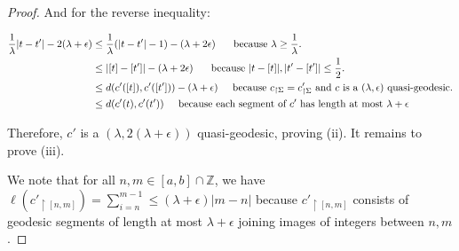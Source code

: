 \documentclass[12pt]{article}
\newcommand{\vs}{\vskip10pt}
\begin{document}
\begin{proof}
 		And for the reverse inequality: 
 		
		\vs 
		
		\begin{align*}
		\frac{1}{\lambda} \vert t - t' \vert - 2(\lambda + \epsilon) &\leq \frac{1}{\lambda} (\vert t - t' \vert - 1) - (\lambda + 2 \epsilon) \hspace{0.5cm} \text{ because } \lambda \geq \frac{1}{\lambda}. \\
		&\leq \vert [t] - [t'] \vert - (\lambda + 2 \epsilon) \hspace{0.5cm} \text{ because } \vert t - [t] \vert, \vert t' - [t'] \vert \leq \frac{1}{2}. \\
		&\leq d(c'([t]), c'([t'])) - (\lambda + \epsilon) \hspace{0.5cm} \text{because } c_{\restriction \Sigma} = c'_{\restriction \Sigma} \text{ and } c \text{ is a } (\lambda, \epsilon) \text{ quasi-geodesic}. \\
		&\leq d(c'(t), c'(t')) \hspace{0.5cm} \text{because each segment of } c' \text{ has length at most } \lambda + \epsilon 
		\end{align*}
		
		Therefore, $c'$ is a $(\lambda, 2(\lambda + \epsilon))$ quasi-geodesic, proving (ii). It remains to prove (iii). 
		
		\vs 
		
		We note that for all $n,m \in [a,b] \cap \mathbb{Z}$, we have $\ell(c'_{\restriction [n,m]}) = \sum_{i=n}^{m-1} \leq (\lambda + \epsilon) \vert m - n \vert$ because $c'_{\restriction [n,m]}$ consists of geodesic segments of length at most $\lambda + \epsilon$ joining images of integers between $n,m$. 
		
		\vs 
		

\end{proof}
\end{document}
